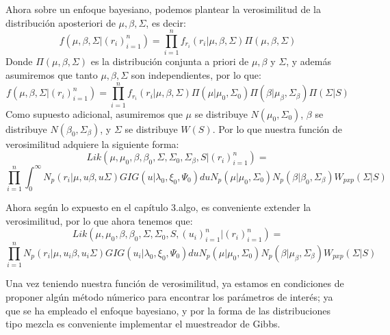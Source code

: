 \documentclass[11pt]{book}
\begin{document}
Ahora sobre un enfoque bayesiano, podemos plantear la verosimilitud de la distribución aposteriori de $\mu,\beta,\Sigma$, es decir:
\begin{equation*}
f(\mu,\beta,\Sigma|(r_{i})_{i=1}^{n})=\prod_{i=1}^{n}f_{r_{i}}(r_{i}|\mu,\beta,\Sigma)\Pi(\mu,\beta,\Sigma)
\end{equation*}   
Donde $\Pi(\mu,\beta,\Sigma)$ es la distribución conjunta a priori de $\mu,\beta$ y $\Sigma$, y además asumiremos que tanto $\mu,\beta,\Sigma$ son independientes, por lo que:
\begin{equation*}
f(\mu,\beta,\Sigma|(r_{i})_{i=1}^{n})=\prod_{i=1}^{n}f_{r_{i}}(r_{i}|\mu,\beta,\Sigma)\Pi(\mu|\mu_{0},\Sigma_{0})\Pi(\beta|\mu_{\beta},\Sigma_{\beta})\Pi(\Sigma|S)
\end{equation*}
 Como supuesto adicional, asumiremos que $\mu$ se distribuye $N(\mu_{0},\Sigma_{0})$, $\beta$ se distribuye $N(\beta_{0},\Sigma_{\beta})$, y $\Sigma$ se distribuye $W(S)$. Por lo que nuestra función de verosimilitud adquiere la siguiente forma:
\begin{equation*}
Lik(\mu,\mu_{0},\beta,\beta_{0},\Sigma,\Sigma_{0},\Sigma_{\beta},S|(r_{i})_{i=1}^{n})=
\end{equation*}
\begin{equation*}
\prod_{i=1}^{n}\int_{0}^{\infty}N_{p}(r_{i}|\mu,u\beta,u\Sigma)GIG(u|\lambda_{0},\xi_{0},\Psi_{0})du N_{p}(\mu|\mu_{0},\Sigma_{0})N_{p}(\beta|\beta_{0},\Sigma_{\beta})W_{pxp}(\Sigma|S)
\end{equation*}

Ahora según lo expuesto en el capítulo 3.algo, es conveniente extender la verosimilitud, por lo que ahora tenemos que:
\begin{equation*}
Lik(\mu,\mu_{0},\beta,\beta_{0},\Sigma,\Sigma_{0},S,(u_{i})_{i=1}^{n}|(r_{i})_{i=1}^{n})=
\end{equation*}
\begin{equation*}
\prod_{i=1}^{n}N_{p}(r_{i}|\mu,u_{i}\beta,u_{i}\Sigma)GIG(u_{i}|\lambda_{0},\xi_{0},\Psi_{0})du N_{p}(\mu|\mu_{0},\Sigma_{0})N_{p}(\beta|\mu_{\beta},\Sigma_{\beta})W_{pxp}(\Sigma|S)
\end{equation*}

Una vez teniendo nuestra función de verosimilitud, ya estamos en condiciones de proponer algún método númerico para encontrar los parámetros de interés; ya que se ha empleado el enfoque bayesiano, y por la forma de las distribuciones tipo mezcla es conveniente implementar el muestreador de Gibbs.\\
\end{document}

